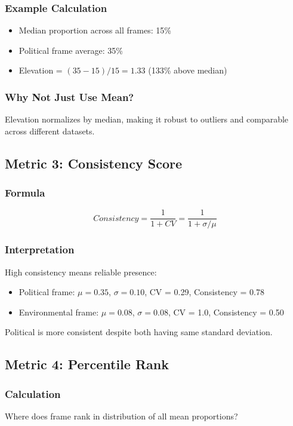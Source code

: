 \documentclass[11pt]{article}
\begin{document}
\subsubsection{Example Calculation}
\begin{itemize}
    \item Median proportion across all frames: 15\%
    \item Political frame average: 35\%
    \item Elevation = $(35 - 15) / 15 = 1.33$ (133\% above median)
\end{itemize}

\subsubsection{Why Not Just Use Mean?}
Elevation normalizes by median, making it robust to outliers and comparable across different datasets.

\subsection{Metric 3: Consistency Score}

\subsubsection{Formula}
\[Consistency = \frac{1}{1 + CV} = \frac{1}{1 + \sigma/\mu}\]

\subsubsection{Interpretation}

High consistency means reliable presence:
\begin{itemize}
    \item Political frame: $\mu = 0.35$, $\sigma = 0.10$, CV = 0.29, Consistency = 0.78
    \item Environmental frame: $\mu = 0.08$, $\sigma = 0.08$, CV = 1.0, Consistency = 0.50
\end{itemize}

Political is more consistent despite both having same standard deviation.

\subsection{Metric 4: Percentile Rank}

\subsubsection{Calculation}
Where does frame rank in distribution of all mean proportions?
\end{document}
